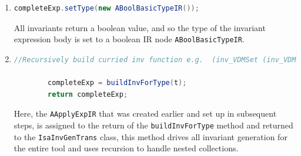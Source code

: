 \begin{enumerate}
	    \item \begin{lstlisting}[language=Java]
	   	completeExp.setType(new ABoolBasicTypeIR());
	    \end{lstlisting}
	    All invariants return a boolean value, and so the type of the invariant expression body is set to a boolean IR node \lstinline[language=Java]{ABoolBasicTypeIR}.
	    \item \begin{lstlisting}[language=Java]
	    //Recursively build curried inv function e.g.  (inv_VDMSet (inv_VDMSet inv_Nat1)) inv_x
       
		completeExp = buildInvForType(t);
		return completeExp;
	    \end{lstlisting}
	    Here, the \lstinline[language=Java]{AApplyExpIR} that was created earlier and set up in subsequent steps, is assigned to the return of the \lstinline[language=Java]{buildInvForType} method and returned to the \lstinline[language=Java]{IsaInvGenTrans} class, this method drives all invariant generation for the entire tool and uses recursion to handle nested collections.
	\end{enumerate}
